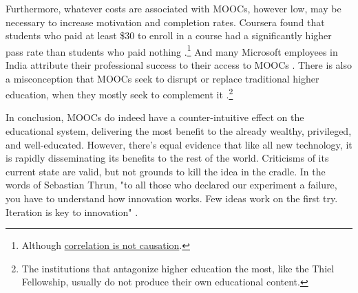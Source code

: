 \documentclass[
	letterpaper, %
]{jdf}
\begin{document}
Furthermore, whatever costs are associated with MOOCs, however low, may be necessary to increase motivation and completion rates. Coursera found that students who paid at least \$30 to enroll in a course had a significantly higher pass rate than students who paid nothing .\footnote{Although \href{https://xkcd.com/552/}{correlation is not causation}.} And many Microsoft employees in India attribute their professional success to their access to MOOCs . There is also a misconception that MOOCs seek to disrupt or replace traditional higher education, when they mostly seek to complement it .\footnote{The institutions that antagonize higher education the most, like the Thiel Fellowship, usually do not produce their own educational content.}

In conclusion, MOOCs do indeed have a counter-intuitive effect on the educational system, delivering the most benefit to the already wealthy, privileged, and well-educated. However, there's equal evidence that like all new technology, it is rapidly disseminating its benefits to the rest of the world. Criticisms of its current state are valid, but not grounds to kill the idea in the cradle. In the words of Sebastian Thrun, "to all those who declared our experiment a failure, you have to understand how innovation works. Few ideas work on the first try. Iteration is key to innovation" .

\printbibliography{}
\end{document}
